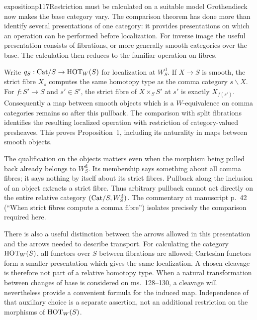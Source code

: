 \begin{dcomment}{exposition}{p117}{Restriction must be calculated on a suitable model}
Grothendieck now makes the base category vary. The comparison theorem has done more than identify several presentations of one category: it provides presentations on which an operation can be performed before localization. For inverse image the useful presentation consists of fibrations, or more generally smooth categories over the base. The calculation then reduces to the familiar operation on fibres.

Write $q_S:\mathrm{Cat}/S\to\mathrm{HOT}_W(S)$ for localization at $W_S^{\mathrm d}$. If $X\to S$ is smooth, the strict fibre $X_s$ computes the same homotopy type as the comma category $s\backslash X$. For $f:S'\to S$ and $s'\in S'$, the strict fibre of $X\times_S S'$ at $s'$ is exactly $X_{f(s')}$. Consequently a map between smooth objects which is a $W$-equivalence on comma categories remains so after this pullback. The comparison with split fibrations identifies the resulting localized operation with restriction of category-valued presheaves. This proves Proposition~1, including its naturality in maps between smooth objects.

The qualification on the objects matters even when the morphism being pulled back already belongs to $W_S^{\mathrm d}$. Its membership says something about all comma fibres; it says nothing by itself about its strict fibres. Pullback along the inclusion of an object extracts a strict fibre. Thus arbitrary pullback cannot act directly on the entire relative category $(\mathrm{Cat}/S,W_S^{\mathrm d})$. The commentary at manuscript p.~42 (``When strict fibres compute a comma fibre'') isolates precisely the comparison required here.

There is also a useful distinction between the arrows allowed in this presentation and the arrows needed to describe transport. For calculating the category $\mathrm{HOT}_W(S)$, all functors over $S$ between fibrations are allowed; Cartesian functors form a smaller presentation which gives the same localization. A chosen cleavage is therefore not part of a relative homotopy type. When a natural transformation between changes of base is considered on ms.~128--130, a cleavage will nevertheless provide a convenient formula for the induced map. Independence of that auxiliary choice is a separate assertion, not an additional restriction on the morphisms of $\mathrm{HOT}_W(S)$.
\end{dcomment}


